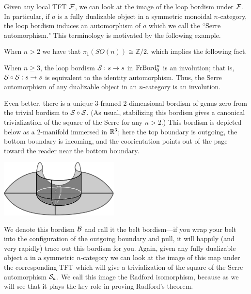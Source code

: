 \documentclass{amsart}
\begin{document}
Given any local TFT $\mathcal F$, we can look at the image of the loop bordism under $\mathcal F$.  In particular, if $a$ is a fully dualizable object in a symmetric monoidal $n$-category, the loop bordism induces an automorphism of $a$ which we call the ``Serre automorphism."  This terminology is motivated by the following example.

\begin{example}
\end{example}

When $n>2$ we have that $\pi_1(SO(n)) \cong \mathbb{Z}/2$, which implies the following fact.

\begin{proposition}
When $n \geq 3$, the loop bordism $\mathcal S: s \rightarrow s$ in $\mathrm{FrBord}_0^n$ is an involution; that is, $\mathcal S \circ \mathcal S : s \rightarrow s$ is equivalent to the identity automorphism.   Thus, the Serre automorphism of any dualizable object in an $n$-category is an involution.
\end{proposition}

Even better, there is a unique $3$-framed $2$-dimensional bordism of genus zero from the trivial bordism to $\mathcal S \circ \mathcal S$.  (As usual, stabilizing this bordism gives a canonical trivialization of the square of the Serre for any $n > 2$.)  This bordism is depicted below as a $2$-manifold immersed in $\mathbb R^3$; here the top boundary is outgoing, the bottom boundary is incoming, and the coorientation points out of the page toward the reader near the bottom boundary.

\begin{center}
\includegraphics[width=60mm]{cobordism.png}
\end{center}

We denote this bordism $\mathcal B$ and call it the belt bordism---if you wrap your belt into the configuration of the outgoing boundary and pull, it will happily (and very rapidly) trace out this bordism for you.  Again, given any fully dualizable object $a$ in a symmetric $n$-category we can look at the image of this map under the corresponding TFT which will give a trivialization of the square of the Serre automorphism $\mathcal S_a$.  We call this image the Radford isomorphism, because as we will see that it plays the key role in proving Radford's theorem.
\end{document}
